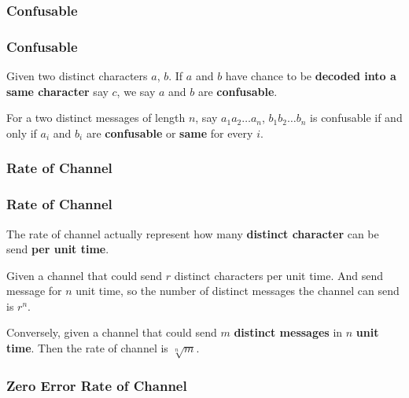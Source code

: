 \subsubsection*{Confusable}

      \begin{frame}
            \frametitle{Confusable}
            \begin{definition}[confusable]
                  Given two distinct characters $a$, $b$. If $a$ and $b$ have chance to be \textbf{decoded into a same character} say $c$, we say $a$ and $b$ are \textbf{confusable}.

                  For a two distinct messages of length $n$, say $a_{1}a_{2}\dots a_{n}$, $b_{1}b_{2}\dots b_{n}$ is confusable if and only if $a_{i}$ and $b_{i}$ are \textbf{confusable} or \textbf{same} for every $i$.
            \end{definition}
      \end{frame}

\subsubsection*{Rate of Channel}

      \begin{frame}
            \frametitle{Rate of Channel}

            \begin{definition}
                  The rate of channel actually represent how many \textbf{distinct character} can be send \textbf{per unit time}.

                  Given a channel that could send $r$ distinct characters per unit time. And send message for $n$ unit time, so the number of distinct messages the channel can send is $r^{n}$.

                  \pause

                  Conversely, given a channel that could send $m$ \textbf{distinct messages} in $n$ \textbf{unit time}.
                  Then the rate of channel is $\sqrt[n]{m}$.
                  
            \end{definition}
      \end{frame}

\subsubsection*{Zero Error Rate of Channel}

